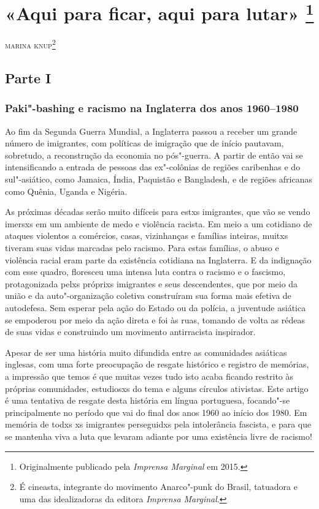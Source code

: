 \chapter[«Aqui para ficar, aqui para lutar»]{«Aqui para ficar, aqui para lutar» \footnote[*]{Originalmente publicado pela \emph{Imprensa Marginal} em 2015.}}

\hfill{}\textsc{marina knup}\footnote[\dag]{É cineasta, integrante do movimento Anarco"-punk do Brasil, tatuadora e uma das idealizadoras da editora \emph{Imprensa Marginal}.}

\bigskip

\section{Parte I}

\subsection{Paki"-bashing e racismo na Inglaterra dos anos 1960--1980}

Ao fim da Segunda Guerra Mundial, a Inglaterra passou a receber um grande número de imigrantes, com políticas de imigração que de início pautavam, sobretudo, a reconstrução da economia no pós"-guerra. A partir de então vai se intensificando a entrada de pessoas das ex"-colônias de regiões caribenhas e do sul"-asiático, como Jamaica, Índia, Paquistão e Bangladesh, e de regiões africanas como Quênia, Uganda e Nigéria.

As próximas décadas serão muito difíceis para estxs imigrantes, que vão se vendo imersxs em um ambiente de medo e violência racista. Em meio a um cotidiano de ataques violentos a comércios, casas, vizinhanças e famílias inteiras, muitxs tiveram suas vidas marcadas pelo racismo. Para estas famílias, o abuso e violência racial eram parte da existência cotidiana na Inglaterra. E da indignação com esse quadro, floresceu uma intensa luta contra o racismo e o fascismo, protagonizada pelxs próprixs imigrantes e seus descendentes, que por meio da união e da auto"-organização coletiva construíram sua forma mais efetiva de autodefesa. Sem esperar pela ação do Estado ou da polícia, a juventude asiática se empoderou por meio da ação direta e foi às ruas, tomando de volta as rédeas de suas vidas e construindo um movimento antirracista inspirador.

Apesar de ser uma história muito difundida entre as comunidades asiáticas inglesas, com uma forte preocupação de resgate histórico e registro de memórias, a impressão que temos é que muitas vezes tudo isto acaba ficando restrito às próprias comunidades, estudiosxs do tema e alguns círculos ativistas. Este artigo é uma tentativa de resgate desta história em língua portuguesa, focando"-se principalmente no período que vai do final dos anos 1960 ao início dos 1980. Em memória de todxs xs imigrantes perseguidxs pela intolerância fascista, e para que se mantenha viva a luta que levaram adiante por uma existência livre de racismo!

